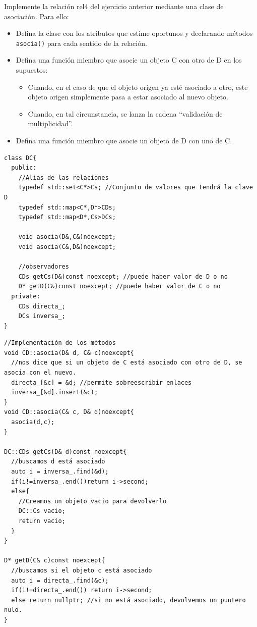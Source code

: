 \newpage
{} Implemente la relación rel4 del ejercicio anterior mediante una clase de asociación. Para ello:
\begin{itemize}
  \item Defina la clase con los atributos que estime oportunos y declarando métodos \texttt{asocia()} para cada sentido de la relación.
  \item Defina una función miembro que asocie un objeto C con otro de D en los supuestos:
  \begin{itemize}
    \item Cuando, en el caso de que el objeto origen ya esté asociado a otro, este objeto origen simplemente pasa a estar asociado al nuevo objeto.
    \item Cuando, en tal circunstancia, se lanza la cadena “validación de multiplicidad”.
  \end{itemize}
  \item Defina una función miembro que asocie un objeto de D con uno de C.
\end{itemize}

\begin{verbatim}
class DC{
  public:
    //Alias de las relaciones 
    typedef std::set<C*>Cs; //Conjunto de valores que tendrá la clave D
    typedef std::map<C*,D*>CDs;
    typedef std::map<D*,Cs>DCs;
    
    void asocia(D&,C&)noexcept;
    void asocia(C&,D&)noexcept;

    //observadores
    CDs getCs(D&)const noexcept; //puede haber valor de D o no
    D* getD(C&)const noexcept; //puede haber valor de C o no
  private:
    CDs directa_;
    DCs inversa_;
}
\end{verbatim}
\begin{verbatim}
//Implementación de los métodos
void CD::asocia(D& d, C& c)noexcept{
  //nos dice que si un objeto de C está asociado con otro de D, se asocia con el nuevo.
  directa_[&c] = &d; //permite sobreescribir enlaces
  inversa_[&d].insert(&c);
}
void CD::asocia(C& c, D& d)noexcept{
  asocia(d,c);
}

DC::CDs getCs(D& d)const noexcept{
  //buscamos d está asociado
  auto i = inversa_.find(&d);
  if(i!=inversa_.end())return i->second;
  else{
    //Creamos un objeto vacio para devolverlo
    DC::Cs vacio;
    return vacio;
  }
}

D* getD(C& c)const noexcept{
  //buscamos si el objeto c está asociado
  auto i = directa_.find(&c);
  if(i!=directa_.end()) return i->second;
  else return nullptr; //si no está asociado, devolvemos un puntero nulo.
}
\end{verbatim}

